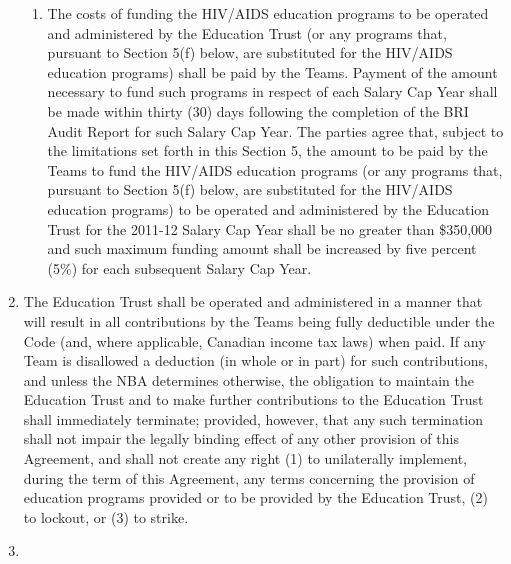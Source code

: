 \documentclass[
]{book}
\begin{document}
\begin{enumerate}
\begin{enumerate}
  \item
    The costs of funding the HIV/AIDS education programs to be operated and administered by the Education Trust (or any programs that, pursuant to Section 5(f) below, are substituted for the HIV/AIDS education programs) shall be paid by the Teams. Payment of the amount necessary to fund such programs in respect of each Salary Cap Year shall be made within thirty (30) days following the completion of the BRI Audit Report for such Salary Cap Year. The parties agree that, subject to the limitations set forth in this Section 5, the amount to be paid by the Teams to fund the HIV/AIDS education programs (or any programs that, pursuant to Section 5(f) below, are substituted for the HIV/AIDS education programs) to be operated and administered by the Education Trust for the 2011-12 Salary Cap Year shall be no greater than \$350,000 and such maximum funding amount shall be increased by five percent (5\%) for each subsequent Salary Cap Year.
  \end{enumerate}
\item
  The Education Trust shall be operated and administered in a manner that will result in all contributions by the Teams being fully deductible under the Code (and, where applicable, Canadian income tax laws) when paid. If any Team is disallowed a deduction (in whole or in part) for such contributions, and unless the NBA determines otherwise, the obligation to maintain the Education Trust and to make further contributions to the Education Trust shall immediately terminate; provided, however, that any such termination shall not impair the legally binding effect of any other provision of this Agreement, and shall not create any right (1) to unilaterally implement, during the term of this Agreement, any terms concerning the provision of education programs provided or to be provided by the Education Trust, (2) to lockout, or (3) to strike.
\item

\end{enumerate}
\end{document}
